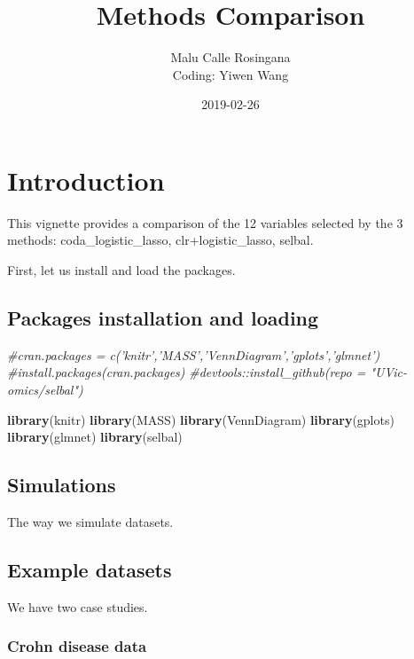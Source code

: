 \documentclass[]{book}
\title{Methods Comparison}
\author{Malu Calle Rosingana\\
Coding: Yiwen Wang}
\date{2019-02-26}
\newenvironment{Shaded}{\begin{snugshade}}{\end{snugshade}}
\newcommand{\KeywordTok}[1]{\textcolor[rgb]{0.13,0.29,0.53}{\textbf{#1}}}
\newcommand{\CommentTok}[1]{\textcolor[rgb]{0.56,0.35,0.01}{\textit{#1}}}
\newcommand{\NormalTok}[1]{#1}
\begin{document}
\maketitle

{
\setcounter{tocdepth}{3}
\tableofcontents
}
\chapter{Introduction}\label{introduction}

This vignette provides a comparison of the 12 variables selected by the
3 methods: coda\_logistic\_lasso, clr+logistic\_lasso, selbal.

First, let us install and load the packages.

\section{Packages installation and
loading}\label{packages-installation-and-loading}

\begin{Shaded}
\begin{Highlighting}[]
\CommentTok{#cran.packages = c('knitr','MASS','VennDiagram','gplots','glmnet')}
\CommentTok{#install.packages(cran.packages)}
\CommentTok{#devtools::install_github(repo = "UVic-omics/selbal")}

\KeywordTok{library}\NormalTok{(knitr)}
\KeywordTok{library}\NormalTok{(MASS)}
\KeywordTok{library}\NormalTok{(VennDiagram)}
\KeywordTok{library}\NormalTok{(gplots)}
\KeywordTok{library}\NormalTok{(glmnet)}
\KeywordTok{library}\NormalTok{(selbal)}
\end{Highlighting}
\end{Shaded}

\section{Simulations}\label{simulations}

The way we simulate datasets.

\section{Example datasets}\label{example-datasets}

We have two case studies.

\subsection{Crohn disease data}\label{crohn-disease-data}
\end{document}
